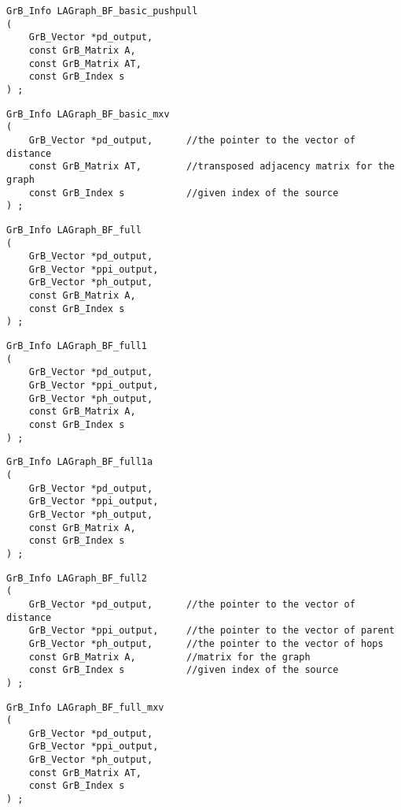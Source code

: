 \begin{verbatim}
GrB_Info LAGraph_BF_basic_pushpull
(
    GrB_Vector *pd_output,
    const GrB_Matrix A,
    const GrB_Matrix AT,
    const GrB_Index s
) ;
\end{verbatim}




\begin{verbatim}
GrB_Info LAGraph_BF_basic_mxv
(
    GrB_Vector *pd_output,      //the pointer to the vector of distance
    const GrB_Matrix AT,        //transposed adjacency matrix for the graph
    const GrB_Index s           //given index of the source
) ;
\end{verbatim}




\begin{verbatim}
GrB_Info LAGraph_BF_full
(
    GrB_Vector *pd_output,
    GrB_Vector *ppi_output,
    GrB_Vector *ph_output,
    const GrB_Matrix A,
    const GrB_Index s
) ;
\end{verbatim}




\begin{verbatim}
GrB_Info LAGraph_BF_full1
(
    GrB_Vector *pd_output,
    GrB_Vector *ppi_output,
    GrB_Vector *ph_output,
    const GrB_Matrix A,
    const GrB_Index s
) ;
\end{verbatim}




\begin{verbatim}
GrB_Info LAGraph_BF_full1a
(
    GrB_Vector *pd_output,
    GrB_Vector *ppi_output,
    GrB_Vector *ph_output,
    const GrB_Matrix A,
    const GrB_Index s
) ;
\end{verbatim}




\begin{verbatim}
GrB_Info LAGraph_BF_full2
(
    GrB_Vector *pd_output,      //the pointer to the vector of distance
    GrB_Vector *ppi_output,     //the pointer to the vector of parent
    GrB_Vector *ph_output,      //the pointer to the vector of hops
    const GrB_Matrix A,         //matrix for the graph
    const GrB_Index s           //given index of the source
) ;
\end{verbatim}




\begin{verbatim}
GrB_Info LAGraph_BF_full_mxv
(
    GrB_Vector *pd_output,
    GrB_Vector *ppi_output,
    GrB_Vector *ph_output,
    const GrB_Matrix AT,
    const GrB_Index s
) ;
\end{verbatim}




